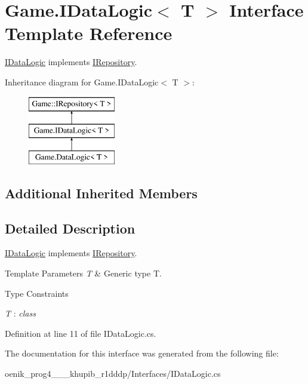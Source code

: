 \hypertarget{interface_game_1_1_i_data_logic}{}\section{Game.\+I\+Data\+Logic$<$ T $>$ Interface Template Reference}
\label{interface_game_1_1_i_data_logic}


\mbox{\hyperlink{interface_game_1_1_i_data_logic}{I\+Data\+Logic}} implements \mbox{\hyperlink{interface_game_1_1_i_repository}{I\+Repository}}.  


Inheritance diagram for Game.\+I\+Data\+Logic$<$ T $>$\+:\begin{figure}[H]
\begin{center}
\leavevmode
\includegraphics[height=3.000000cm]{interface_game_1_1_i_data_logic}
\end{center}
\end{figure}
\subsection*{Additional Inherited Members}


\subsection{Detailed Description}
\mbox{\hyperlink{interface_game_1_1_i_data_logic}{I\+Data\+Logic}} implements \mbox{\hyperlink{interface_game_1_1_i_repository}{I\+Repository}}. 


\begin{DoxyTemplParams}{Template Parameters}
{\em T} & Generic type T.\\
\hline
\end{DoxyTemplParams}
\begin{Desc}
\item[Type Constraints]\begin{description}
\item[{\em T} : {\em class}]\end{description}
\end{Desc}


Definition at line 11 of file I\+Data\+Logic.\+cs.



The documentation for this interface was generated from the following file\+:\begin{DoxyCompactItemize}
\item 
oenik\+\_\+prog4\+\_\+\_\+\_\+khupib\+\_\+r1dddp/\+Interfaces/I\+Data\+Logic.\+cs\end{DoxyCompactItemize}

